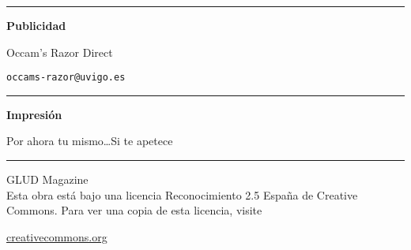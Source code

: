 \begin{textblock}{30}
\begin{minipage}{0.12\linewidth}
\begin{center}
\vspace{15.0mm}




\vspace{2mm}

\hrule

\vspace{4mm}

{\bf Publicidad}

\vspace{3mm}

Occam's Razor Direct

{\tt occams-razor@uvigo.es}

\vspace{4mm}

\hrule

\vspace{6mm}

{\bf Impresión}

Por ahora tu mismo\ldots Si te apetece

\vspace{3mm}

\hrule

\vspace{9mm}

 GLUD Magazine \\

Esta obra está bajo una licencia Reconocimiento 2.5 España de Creative
Commons. Para ver una copia de esta licencia, visite 

{\scriptsize \href{http://creativecommons.org/licenses/by/2.5/es/}{creativecommons.org}} 

\end{center}
\end{minipage}

\end{textblock}

